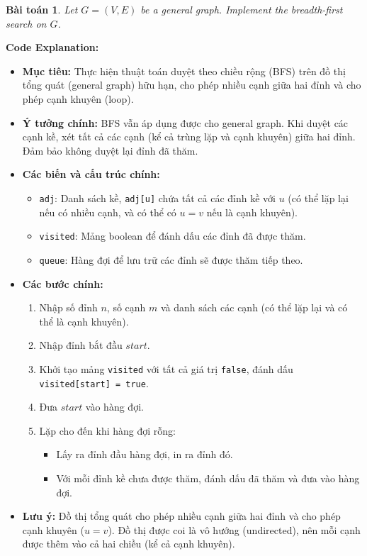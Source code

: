 \documentclass{article}
\newtheorem{baitoan}{Bài toán}
\begin{document}
\begin{baitoan}
    Let $G = (V,E)$ be a general graph. Implement the breadth-first search on $G$.
\end{baitoan}


\textbf{Code Explanation:}

\begin{itemize}
    \item \textbf{Mục tiêu:} Thực hiện thuật toán duyệt theo chiều rộng (BFS) trên đồ thị tổng quát (general graph) hữu hạn, cho phép nhiều cạnh giữa hai đỉnh và cho phép cạnh khuyên (loop).
    \item \textbf{Ý tưởng chính:} BFS vẫn áp dụng được cho general graph. Khi duyệt các cạnh kề, xét tất cả các cạnh (kể cả trùng lặp và cạnh khuyên) giữa hai đỉnh. Đảm bảo không duyệt lại đỉnh đã thăm.
    \item \textbf{Các biến và cấu trúc chính:}
    \begin{itemize}
        \item \texttt{adj}: Danh sách kề, \texttt{adj[u]} chứa tất cả các đỉnh kề với $u$ (có thể lặp lại nếu có nhiều cạnh, và có thể có $u = v$ nếu là cạnh khuyên).
        \item \texttt{visited}: Mảng boolean để đánh dấu các đỉnh đã được thăm.
        \item \texttt{queue}: Hàng đợi để lưu trữ các đỉnh sẽ được thăm tiếp theo.
    \end{itemize}
    \item \textbf{Các bước chính:}
    \begin{enumerate}
        \item Nhập số đỉnh $n$, số cạnh $m$ và danh sách các cạnh (có thể lặp lại và có thể là cạnh khuyên).
        \item Nhập đỉnh bắt đầu $start$.
        \item Khởi tạo mảng \texttt{visited} với tất cả giá trị \texttt{false}, đánh dấu \texttt{visited[start] = true}.
        \item Đưa $start$ vào hàng đợi.
        \item Lặp cho đến khi hàng đợi rỗng:
        \begin{itemize}
            \item Lấy ra đỉnh đầu hàng đợi, in ra đỉnh đó.
            \item Với mỗi đỉnh kề chưa được thăm, đánh dấu đã thăm và đưa vào hàng đợi.
        \end{itemize}
    \end{enumerate}
    \item \textbf{Lưu ý:} Đồ thị tổng quát cho phép nhiều cạnh giữa hai đỉnh và cho phép cạnh khuyên ($u = v$). Đồ thị được coi là vô hướng (undirected), nên mỗi cạnh được thêm vào cả hai chiều (kể cả cạnh khuyên).
\end{itemize}
\end{document}
